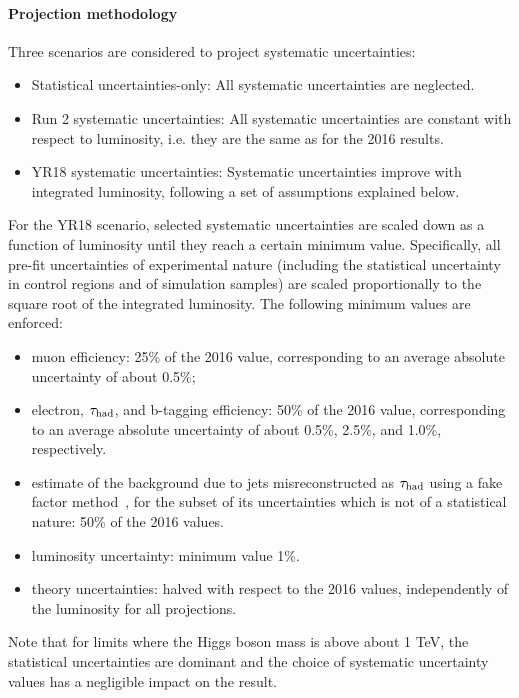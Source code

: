 \paragraph{Projection methodology}
\label{sec:method}
%
Three scenarios are considered to project systematic uncertainties:
\begin{itemize}
\item
Statistical uncertainties-only: All systematic uncertainties are neglected.
\item
Run 2 systematic uncertainties: All systematic uncertainties are constant with respect to luminosity, i.e. they are the same as for the 2016 results.
\item
YR18 systematic uncertainties: Systematic uncertainties improve with integrated luminosity, following a set of assumptions explained below.
\end{itemize}
For the YR18 scenario, selected systematic uncertainties are scaled down as a function of luminosity until they reach a certain minimum value. 
Specifically, all pre-fit uncertainties of experimental nature (including the statistical uncertainty in control regions and of simulation samples) 
are scaled proportionally to the square root of the integrated luminosity.
The following minimum values are enforced:
\begin{itemize}
\item
muon efficiency: 25\% of the 2016 value, corresponding to an average absolute uncertainty of about 0.5\%; 
\item
electron, $\tau_{\text{had}}$, and b-tagging efficiency: 50\% of the 2016 value, 
corresponding to an average absolute uncertainty of about 0.5\%, 2.5\%, and 1.0\%, respectively.
\item
estimate of the background due to jets misreconstructed as $\tau_{\text{had}}$ using a fake factor method~\cite{HIG-15-007}, 
for the subset of its uncertainties which is not of a statistical nature: 50\% of the 2016 values.
\item
luminosity uncertainty: minimum value 1\%.
\item
theory uncertainties: halved with respect to the 2016 values, independently of the luminosity for all projections.
\end{itemize}
Note that for limits where the Higgs boson mass is above about 1 TeV, the statistical uncertainties are dominant and the choice of systematic uncertainty values has 
a negligible impact on the result.

